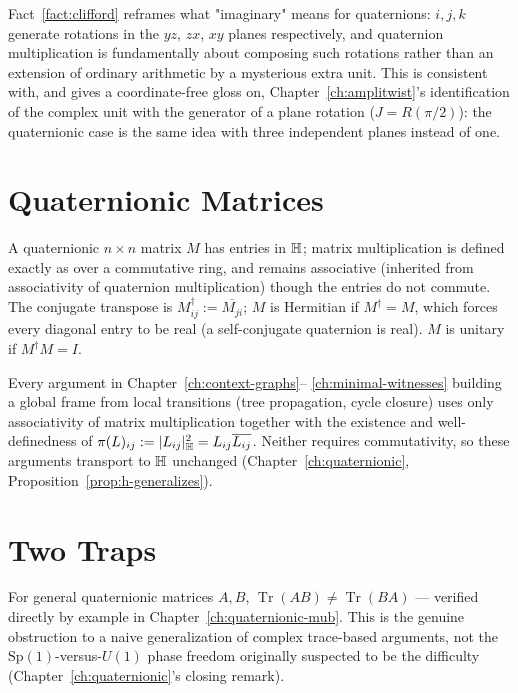 \begin{remark}
Fact~\ref{fact:clifford} reframes what "imaginary" means for quaternions:
$i,j,k$ generate rotations in the $yz$, $zx$, $xy$ planes respectively,
and quaternion multiplication is fundamentally about composing such
rotations rather than an extension of ordinary arithmetic by a mysterious
extra unit. This is consistent with, and gives a coordinate-free gloss on,
Chapter~\ref{ch:amplitwist}'s identification of the complex unit with the
generator of a plane rotation ($J = R(\pi/2)$): the quaternionic case is
the same idea with three independent planes instead of one.
\end{remark}

\section{Quaternionic Matrices}

A quaternionic $n\times n$ matrix $M$ has entries in $\mathbb{H}$; matrix
multiplication is defined exactly as over a commutative ring, and remains
associative (inherited from associativity of quaternion multiplication)
though the entries do not commute. The conjugate transpose is
$M^\dagger_{ij} := \overline{M_{ji}}$; $M$ is Hermitian if $M^\dagger=M$,
which forces every diagonal entry to be real (a self-conjugate quaternion
is real). $M$ is unitary if $M^\dagger M = I$.

\begin{fact}
Every argument in Chapter~\ref{ch:context-graphs}--
\ref{ch:minimal-witnesses} building a global frame from local transitions
(tree propagation, cycle closure) uses only associativity of matrix
multiplication together with the existence and well-definedness of
$\pi(L)_{ij} := |L_{ij}|^2_{\mathbb{H}} = L_{ij}\overline{L_{ij}}$. Neither
requires commutativity, so these arguments transport to $\mathbb{H}$ unchanged
(Chapter~\ref{ch:quaternionic}, Proposition~\ref{prop:h-generalizes}).
\end{fact}

\section{Two Traps}

\begin{fact}
\label{fact:trace-noncyclic}
For general quaternionic matrices $A,B$, $\operatorname{Tr}(AB) \ne
\operatorname{Tr}(BA)$ — verified directly by example in
Chapter~\ref{ch:quaternionic-mub}. This is the genuine obstruction to a
naive generalization of complex trace-based arguments, not the
$\mathrm{Sp}(1)$-versus-$U(1)$ phase freedom originally suspected to be the
difficulty (Chapter~\ref{ch:quaternionic}'s closing remark).
\end{fact}


